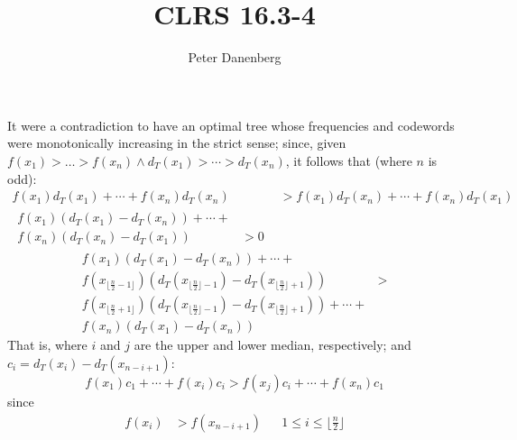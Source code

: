 \documentclass{article}
\title{CLRS 16.3-4}
\author{Peter Danenberg}
\begin{document}
\maketitle

It were a contradiction to have an optimal tree whose frequencies and
codewords were monotonically increasing in the strict sense; since, given $f(x_1) > \dots > f(x_n) \wedge d_T(x_1) > \cdots > d_T(x_n)$, it follows that (where $n$ is odd):
\begin{align}
  f(x_1)d_T(x_1) + \cdots + f(x_n)d_T(x_n) &> f(x_1)d_T(x_n) + \cdots
  + f(x_n)d_T(x_1)\\
  \begin{split}
    f(x_1)(d_T(x_1) - d_T(x_n)) + \cdots + \\
    f(x_n)(d_T(x_n) - d_T(x_1)) &> 0
  \end{split}
\end{align}
\begin{equation}
  \begin{split}
    f(x_1)(d_T(x_1) - d_T(x_n)) + \cdots +\\
    f(x_{\lfloor\frac{n}{2} - 1\rfloor})(d_T(x_{\lfloor\frac{n}{2}\rfloor -
      1}) - d_T(x_{\lfloor\frac{n}{2}\rfloor + 1})) &>\\
    f(x_{\lfloor\frac{n}{2} + 1\rfloor})(d_T(x_{\lfloor\frac{n}{2}\rfloor -
      1}) - d_T(x_{\lfloor\frac{n}{2}\rfloor + 1}))
    + \cdots + \\f(x_n)(d_T(x_1) - d_T(x_n))
  \end{split}
\end{equation}
That is, where $i$ and $j$ are the upper and lower median,
respectively; and $c_i = d_T(x_i) - d_T(x_{n-i+1})$:
\begin{equation}
  f(x_1)c_1 + \cdots + f(x_i)c_i > f(x_j)c_i + \cdots + f(x_n)c_1
\end{equation}
since
\begin{align}
  f(x_i) &> f(x_{n-i+1}) && 1\leq i\leq\lfloor\frac{n}{2}\rfloor
\end{align}
\end{document}
